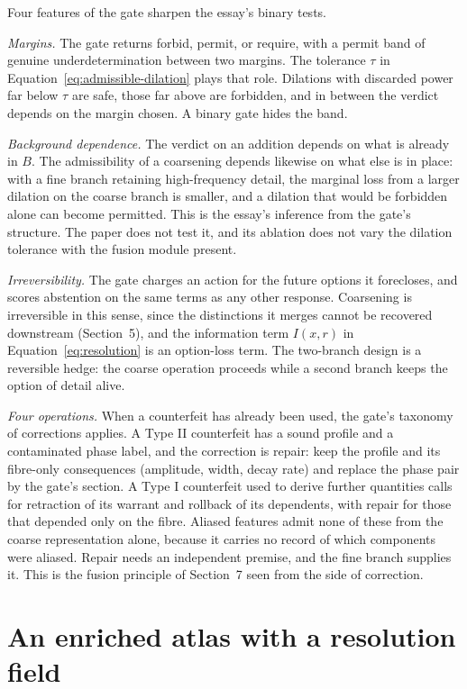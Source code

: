 \documentclass[11pt]{article}
\theoremstyle{definition}
\theoremstyle{remark}
\begin{document}
Four features of the gate sharpen the essay's binary tests.

\emph{Margins.} The gate returns forbid, permit, or require, with a permit band of genuine underdetermination between two margins. The tolerance $\tau$ in Equation~\eqref{eq:admissible-dilation} plays that role. Dilations with discarded power far below $\tau$ are safe, those far above are forbidden, and in between the verdict depends on the margin chosen. A binary gate hides the band.

\emph{Background dependence.} The verdict on an addition depends on what is already in $B$. The admissibility of a coarsening depends likewise on what else is in place: with a fine branch retaining high-frequency detail, the marginal loss from a larger dilation on the coarse branch is smaller, and a dilation that would be forbidden alone can become permitted. This is the essay's inference from the gate's structure. The paper does not test it, and its ablation does not vary the dilation tolerance with the fusion module present.

\emph{Irreversibility.} The gate charges an action for the future options it forecloses, and scores abstention on the same terms as any other response. Coarsening is irreversible in this sense, since the distinctions it merges cannot be recovered downstream (Section~5), and the information term $I(x,r)$ in Equation~\eqref{eq:resolution} is an option-loss term. The two-branch design is a reversible hedge: the coarse operation proceeds while a second branch keeps the option of detail alive.

\emph{Four operations.} When a counterfeit has already been used, the gate's taxonomy of corrections applies. A Type II counterfeit has a sound profile and a contaminated phase label, and the correction is repair: keep the profile and its fibre-only consequences (amplitude, width, decay rate) and replace the phase pair by the gate's section. A Type I counterfeit used to derive further quantities calls for retraction of its warrant and rollback of its dependents, with repair for those that depended only on the fibre. Aliased features admit none of these from the coarse representation alone, because it carries no record of which components were aliased. Repair needs an independent premise, and the fine branch supplies it. This is the fusion principle of Section~7 seen from the side of correction.

\section{An enriched atlas with a resolution field}
\end{document}
